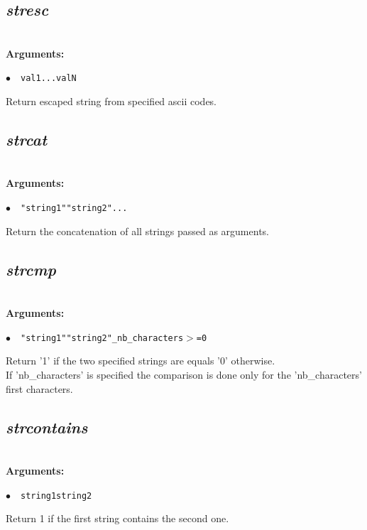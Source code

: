 \documentclass[a4paper,10.5pt,twoside]{book}
\def\comma{\discretionary{,}{}{,}}
\newcommand{\Cb}[1]{\textcolor{cb}{#1}}
\begin{document}
\subsection{\emph{stresc} }\vspace*{-0.7em}
~\\\textbf{\Cb{Arguments: }}\begin{flushleft}
{\small \Cb{\hspace*{0.5cm}$\bullet$~~\texttt{val1{\comma}...{\comma}valN}}}\end{flushleft}
Return escaped string from specified ascii codes.


\subsection{\emph{strcat} }\vspace*{-0.7em}
~\\\textbf{\Cb{Arguments: }}\begin{flushleft}
{\small \Cb{\hspace*{0.5cm}$\bullet$~~\texttt{"string1"{\comma}"string2"{\comma}...}}}\end{flushleft}
Return the concatenation of all strings passed as arguments.


\subsection{\emph{strcmp} }\vspace*{-0.7em}
~\\\textbf{\Cb{Arguments: }}\begin{flushleft}
{\small \Cb{\hspace*{0.5cm}$\bullet$~~\texttt{"string1"{\comma}"string2"{\comma}\_nb\_characters$>$=0}}}\end{flushleft}
Return '1' if the two specified strings are equals{\comma} '0' otherwise.
~\\If 'nb\_characters' is specified{\comma} the comparison is done only for the 'nb\_characters' first characters.


\subsection{\emph{strcontains} }\vspace*{-0.7em}
~\\\textbf{\Cb{Arguments: }}\begin{flushleft}
{\small \Cb{\hspace*{0.5cm}$\bullet$~~\texttt{string1{\comma}string2}}}\end{flushleft}
Return 1 if the first string contains the second one.
\end{document}
